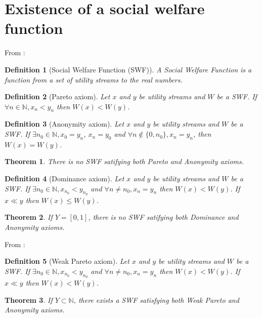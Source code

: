 \documentclass{article}
\newtheorem{definition}{Definition}
\newtheorem{theorem}{Theorem}
\begin{document}
\section{Existence of a social welfare function}

From \cite{basumitra03}:

\begin{definition}[Social Welfare Function (SWF)]
  A Social Welfare Function is a function from a set of utility streams to the real numbers.
\end{definition}

\begin{definition}[Pareto axiom]
  Let $x$ and $y$ be utility streams and $W$ be a SWF.
  If $\forall n \in\mathbb N,x_n<y_n$ then $W(x)<W(y)$.
\end{definition}

\begin{definition}[Anonymity axiom]
  Let $x$ and $y$ be utility streams and $W$ be a SWF.
  If $\exists n_0 \in\mathbb N,x_0=y_n$, $x_n=y_0$ and $\forall n\notin\{0,n_0\}, x_n=y_n$, then $W(x)=W(y)$.
\end{definition}

\begin{theorem}
  There is no SWF satifying both Pareto and Anonymity axioms.
\end{theorem}

\begin{definition}[Dominance axiom]
  Let $x$ and $y$ be utility streams and $W$ be a SWF.
  If $\exists n_0\in\mathbb N, x_{n_0}<y_{n_0}$ and $\forall n\neq n_0, x_n=y_n$ then $W(x)<W(y)$.
  If $x\ll y$ then $W(x)\leq W(y)$.
\end{definition}

\begin{theorem}
  If $Y=[0,1]$, there is no SWF satifying both Dominance and Anonymity axioms.
\end{theorem}

From \cite{basumitra07p}:
\begin{definition}[Weak Pareto axiom]
  Let $x$ and $y$ be utility streams and $W$ be a SWF.
  If $\exists n_0\in\mathbb N, x_{n_0}<y_{n_0}$ and $\forall n\neq n_0, x_n=y_n$ then $W(x)<W(y)$.
  If $x\ll y$ then $W(x)< W(y)$.
\end{definition}

\begin{theorem}
  If $Y\subset\mathbb N$, there exists a SWF satisfying both Weak Pareto and Anonymity axioms.
\end{theorem}



\end{document}
